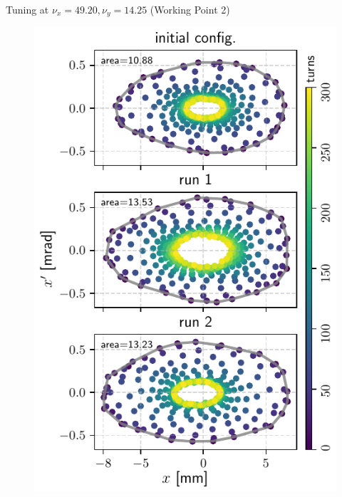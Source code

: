 \documentclass[aspectratio=169]{beamer}
\begin{document}
\begin{frame}{Tuning at $\nu_x = 49.20, \nu_y = 14.25$ (Working Point 2)}
\begin{minipage}{0.44\textwidth}
\begin{figure}
            \includegraphics[height=0.9\textheight]{WEPL087_f4.pdf}
        \end{figure}
    \end{minipage}
\end{frame}
\end{document}
